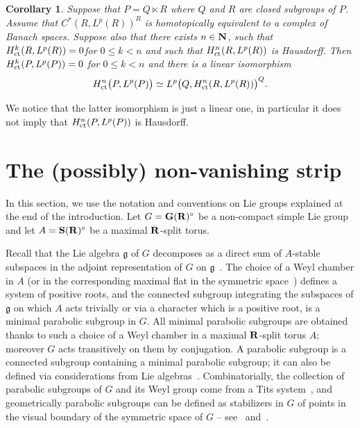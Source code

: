 \documentclass[11pt]{article}
\newtheorem{coro}[theo]{Corollary}
\theoremstyle{definition}
\numberwithin{equation}{section}
\numberwithin{figure}{section}
\numberwithin{table}{section}
\DeclareMathOperator{\ct}{ct}
\begin{document}
\begin{coro}\label{spectral_cor2}
Suppose that $P = Q \ltimes R$ where $Q$ and $R$ are closed subgroups of $P$. Assume that $C^*(R, L^p(R))^R$ is homotopically equivalent to a complex of Banach spaces. Suppose also that there exists $n \in {\bf N}$, such that ${\rm H}_{\ct} ^k (R, L^p(R)) = 0$\linebreak for $0 \leqslant k < n$ and such that ${\rm H}_{\ct} ^n (R, L^p(R))$ is Hausdorff. Then ${\rm H}_{\ct} ^k (P, L^p(P)) = 0$ for $0 \leqslant k < n$ and there is a linear isomorphism
\[
{\rm H}_{\ct} ^n \big(P, L^p(P)\big) \simeq L^p\bigl(Q, {\rm H}_{\ct} ^n (R, L^p(R))\bigr)^Q.
\]
\end{coro}

We notice that the latter isomorphism is just a linear one, in particular it does not imply that ${\rm H}_{\ct} ^n (P, L^p(P))$ is Hausdorff.


\section{The (possibly) non-vanishing strip}\label{6}

In this section, we use the notation and conventions on Lie groups explained at the end of the introduction. Let $G = {\bf G}({\bf R})^\circ$ be a non-compact simple Lie group and let $A = {\bf S}({\bf R})^\circ$ be a maximal ${\bf R}$-split torus.

Recall that the Lie algebra $\mathfrak{g}$ of $G$ decomposes as a direct sum of $A$-stable subspaces in the adjoint representation of $G$ on $\mathfrak{g}$~\cite[3.5]{Borel-LAG}. The choice of a Weyl chamber in $A$ (or in the corresponding maximal flat in the symmetric space~\cite[6.4]{Maubon}) defines a system of positive roots, and the connected subgroup integrating the subspaces of $\mathfrak{g}$ on which $A$ acts trivially or via a character which is a positive root, is a minimal parabolic subgroup in $G$. All minimal parabolic subgroups are obtained thanks to such a choice of a Weyl chamber in a maximal ${\bf R}$-split torus $A$; moreover $G$ acts transitively on them by conjugation. A parabolic subgroup is a connected subgroup containing a minimal parabolic subgroup; it can also be defined via considerations from Lie algebras~\cite[VII.7]{Knapp}. Combinatorially, the collection of parabolic subgroups of $G$ and its Weyl group come from a Tits system~\cite[\textsection~21 and \textsection~24.C]{Borel-LAG}, and geometrically parabolic subgroups can be defined as stabilizers in $G$ of points in the visual boundary of the symmetric space of $G$ -- see~\cite[6.6]{Maubon} and~\cite{BS}.
\end{document}
